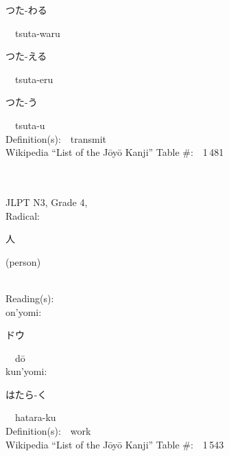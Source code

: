 \begin{multicols}{2}
{\hspace*{2em}}{\begin{CJK}{UTF8}{min} つた-わる \end{CJK}}\ \ tsuta-waru\ \ \\
{\hspace*{2em}}{\begin{CJK}{UTF8}{min} つた-える \end{CJK}}\ \ tsuta-eru\ \ \\
{\hspace*{2em}}{\begin{CJK}{UTF8}{min} つた-う \end{CJK}}\ \ tsuta-u\ \ \\
Definition(s):\ \ transmit \\
Wikipedia ``List of the J\=oy\=o Kanji'' Table \#:\ \ 1\,481 \\
\ \ \\
{\fontsize{34pt}{40pt}  }\ \ \\  %
{JLPT N3, Grade 4, \\Radical:\ \ {\begin{CJK}{UTF8}{min} 人 \end{CJK}} (person) } \\
Reading(s):\ \ \\
{\hspace*{1em}}on'yomi:\ \ \\
{\hspace*{2em}}{\begin{CJK}{UTF8}{min} ドウ \end{CJK}}\ \ d\=o\ \ \\
{\hspace*{1em}}kun'yomi:\ \ \\
{\hspace*{2em}}{\begin{CJK}{UTF8}{min} はたら-く \end{CJK}}\ \ hatara-ku\ \ \\
Definition(s):\ \ work \\
Wikipedia ``List of the J\=oy\=o Kanji'' Table \#:\ \ 1\,543 \\
\ \ \\
{\fontsize{34pt}{40pt}  }\ \ \\  %

\end{multicols}
